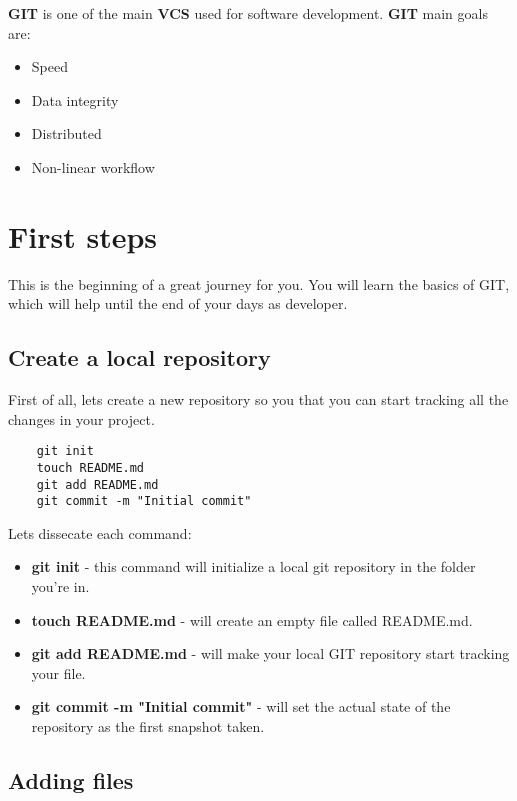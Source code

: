 \documentclass{article}
\begin{document}
\textbf{GIT} is one of the main \textbf{VCS} used for software development. \textbf{GIT} main goals are:

\begin{itemize}
\item{Speed}
\item{Data integrity}
\item{Distributed}
\item{Non-linear workflow}
\end{itemize}

\clearpage

\section{First steps}

This is the beginning of a great journey for you. You will learn the basics of GIT, which will help until the end of your days as developer.

\subsection{Create a local repository}

First of all, lets create a new repository so you that you can start tracking all the changes in your project.

\begin{lstlisting}
	git init
	touch README.md
	git add README.md
	git commit -m "Initial commit"
\end{lstlisting}

Lets dissecate each command:\\

\begin{itemize}
\item{\textbf{git init} - this command will initialize a local git repository in the folder you're in.}
\item{\textbf{touch README.md} - will create an empty file called README.md.}
\item{\textbf{git add README.md} - will make your local GIT repository start tracking your file.}
\item{\textbf{git commit -m "Initial commit"} - will set the actual state of the repository as the first snapshot taken.}
\end{itemize}

\subsection{Adding files}
\end{document}
